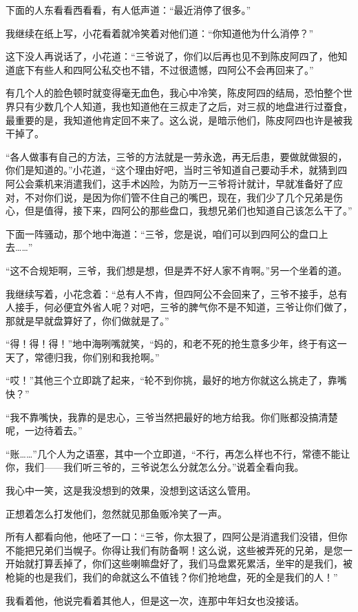 下面的人东看看西看看，有人低声道：“最近消停了很多。”

我继续在纸上写，小花看着就冷笑着对他们道：“你知道他为什么消停？”

这下没人再说话了，小花道：“三爷说了，你们以后再也见不到陈皮阿四了，他知道底下有些人和四阿公私交也不错，不过很遗憾，四阿公不会再回来了。”

有几个人的脸色顿时就变得毫无血色，我心中冷笑，陈皮阿四的结局，恐怕整个世界只有少数几个人知道，我也知道他在三叔走了之后，对三叔的地盘进行过蚕食，最重要的是，我知道他肯定回不来了。这么说，是暗示他们，陈皮阿四也许是被我干掉了。

“各人做事有自己的方法，三爷的方法就是一劳永逸，再无后患，要做就做狠的，你们是知道的。”小花道，“这个理由好吧，当时三爷知道自己要动手术，就猜到四阿公会乘机来消遣我们，这手术凶险，为防万一三爷将计就计，早就准备好了应对，不对你们说，是因为你们管不住自己的嘴巴，现在，我们少了几个兄弟是伤心，但是值得，接下来，四阿公的那些盘口，我想兄弟们也知道自己该怎么干了。”

下面一阵骚动，那个地中海道：“三爷，您是说，咱们可以到四阿公的盘口上去……”

“这不合规矩啊，三爷，我们想是想，但是弄不好人家不肯啊。”另一个坐着的道。

我继续写着，小花念着：“总有人不肯，但四阿公不会回来了，三爷不接手，总有人接手，何必便宜外省人呢？对吧，三爷的脾气你不是不知道，三爷让你们做了，那就是早就盘算好了，你们做就是了。”

“得！得！得！”地中海咧嘴就笑，“妈的，和老不死的抢生意多少年，终于有这一天了，常德归我，你们别和我抢啊。”

“哎！”其他三个立即跳了起来，“轮不到你挑，最好的地方你就这么挑走了，靠嘴快？”

“我不靠嘴快，我靠的是忠心，三爷当然把最好的地方给我。你们账都没搞清楚呢，一边待着去。”

“账……”几个人为之语塞，其中一个立即道，“不行，再怎么样也不行，常德不能让你，我们——我们听三爷的，三爷说怎么分就怎么分。”说着全看向我。

我心中一笑，这是我没想到的效果，没想到这话这么管用。

正想着怎么打发他们，忽然就见那鱼贩冷笑了一声。

所有人都看向他，他呸了一口：“三爷，你太狠了，四阿公是消遣我们没错，但你不能把兄弟们当幌子。你得让我们有防备啊！这么说，这些被弄死的兄弟，是您一开始就打算丢掉了，你们这些喇嘛盘好了，我们马盘累死累活，坐牢的是我们，被枪毙的也是我们，我们的命就这么不值钱？你们抢地盘，死的全是我们的人！”

我看着他，他说完看着其他人，但是这一次，连那中年妇女也没接话。

